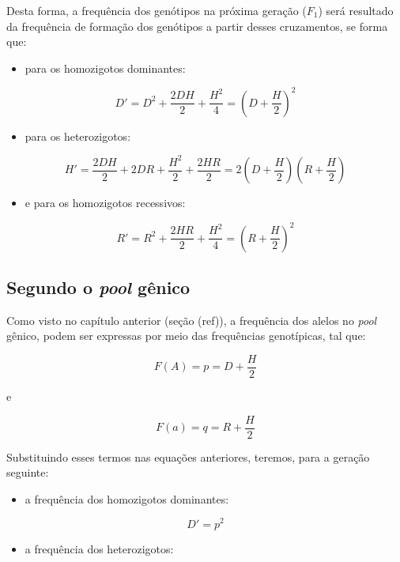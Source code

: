 \documentclass[
]{book}
\providecommand{\tightlist}{%
  \setlength{\itemsep}{0pt}\setlength{\parskip}{0pt}}
\begin{document}
Desta forma, a frequência dos genótipos na próxima geração (\(F_1\)) será resultado da frequência de formação dos genótipos a partir desses cruzamentos, se forma que:

\begin{itemize}
\tightlist
\item
  para os homozigotos dominantes:
\end{itemize}

\[D' = D^2 + \frac {2DH}{2} + \frac {H^2}{4} = \left( D + \frac {H}{2} \right)^2\]

\begin{itemize}
\tightlist
\item
  para os heterozigotos:
\end{itemize}

\[H' = \frac {2DH}{2} + 2DR + \frac {H^2}{2} + \frac {2HR}{2} = 2 \left( D + \frac {H}{2} \right) \left( R + \frac {H}{2} \right)\]

\begin{itemize}
\tightlist
\item
  e para os homozigotos recessivos:
\end{itemize}

\[R' = R^2 + \frac {2HR}{2} + \frac {H^2}{4} = \left( R + \frac {H}{2} \right)^2\]

\hypertarget{segundo-o-pool-guxeanico}{%
\subsection{\texorpdfstring{Segundo o \emph{pool} gênico}{Segundo o pool gênico}}\label{segundo-o-pool-guxeanico}}

Como visto no capítulo anterior (seção (ref)), a frequência dos alelos no \emph{pool} gênico, podem ser expressas por meio das frequências genotípicas, tal que:

\[F(A) = p = D + \frac {H}{2}\]

e

\[F(a) = q = R + \frac {H}{2}\]

Substituindo esses termos nas equações anteriores, teremos, para a geração seguinte:

\begin{itemize}
\tightlist
\item
  a frequência dos homozigotos dominantes:
\end{itemize}

\[D'=p^2\]

\begin{itemize}
\tightlist
\item
  a frequência dos heterozigotos:
\end{itemize}
\end{document}
